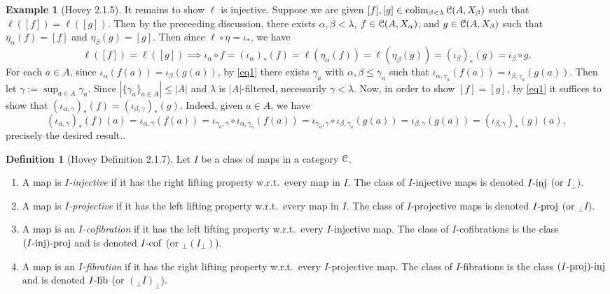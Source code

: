 \documentclass{amsart}
\theoremstyle{plain}
\theoremstyle{definition}
\newtheorem{definition}[theorem]{Definition}
\newtheorem{example}[theorem]{Example}
\newcommand{\0}{\mathbf{0}}
\newcommand{\cC}{\mathcal C}
\renewcommand{\(}{\left(}
\renewcommand{\)}{\right)}
\def\scr{\EuScript}
\def\cC{\scr{C}}
\newcommand{\inj}{\text-\mathrm{inj}}
\newcommand{\proj}{\text-\mathrm{proj}}
\newcommand{\fib}{\text-\mathrm{fib}}
\newcommand{\cof}{\text-\mathrm{cof}}
\DeclareMathOperator*{\colim}{colim}
\begin{document}
\begin{example}[Hovey 2.1.5]
  It remains to show $\ell$ is injective. Suppose we are given $[f],[g]\in\colim_{\beta<\lambda}\cC(A,X_\beta)$ such that $\ell([f])=\ell([g])$. Then by the preceeding discussion, there exists $\alpha,\beta<\lambda$, $f\in\cC(A,X_\alpha)$, and $g\in\cC(A,X_\beta)$ such that $\eta_\alpha(f)=[f]$ and $\eta_\beta(g)=[g]$. 
  Then since $\ell\circ\eta=\iota_*$, we have
  \[\ell([f])=\ell([g])\implies\iota_\alpha\circ f= (\iota_\alpha)_*(f)=\ell(\eta_\alpha(f))=\ell(\eta_\beta(g))=(\iota_\beta)_*(g)=\iota_\beta\circ g.\]
  For each $a\in A$, since $\iota_\alpha(f(a))=\iota_\beta(g(a))$, by \autoref{eq1} there exists $\gamma_a$ with $\alpha,\beta\leq\gamma_a$ such that $\iota_{\alpha,\gamma_a}(f(a))=\iota_{\beta,\gamma_a}(g(a))$. Then let $\gamma:=\sup_{a\in A}\gamma_a$. Since $|\{\gamma_a\}_{a\in A}|\leq|A|$ and $\lambda$ is $|A|$-filtered, necessarily $\gamma<\lambda$. Now, in order to show $[f]=[g]$, by \autoref{eq1} it suffices to show that $(\iota_{\alpha,\gamma})_*(f)=(\iota_{\beta,\gamma})_*(g)$. Indeed, given $a\in A$, we have
  \[(\iota_{\alpha,\gamma})_*(f)(a)=\iota_{\alpha,\gamma}(f(a))=\iota_{\gamma_a,\gamma}\circ\iota_{\alpha,\gamma_a}(f(a))=\iota_{\gamma_a,\gamma}\circ\iota_{\beta,\gamma_a}(g(a))=\iota_{\beta,\gamma}(g(a))=(\iota_{\beta,\gamma})_*(g)(a),\]
  precisely the desired result..
\end{example}

\begin{definition}[Hovey Definition 2.1.7]
  Let $I$ be a class of maps in a category $\cC$.\begin{enumerate}
    \item A map is \textit{$I$-injective} if it has the right lifting property w.r.t.\ every map in $I$. The class of $I$-injective maps is denoted $I\inj$ (or $I_\perp$).
    \item A map is \textit{$I$-projective} if it has the left lifting property w.r.t.\ every map in $I$. The class of $I$-projective maps is denoted $I\proj$ (or $_\perp I$).
    \item A map is an \textit{$I$-cofibration} if it has the left lifting property w.r.t.\ every $I$-injective map. The class of $I$-cofibrations is the class $(I\inj)\proj$ and is denoted $I\cof$ (or $_\perp(I_\perp)$).
    \item A map is an \textit{$I$-fibration} if it has the right lifting property w.r.t.\ every $I$-projective map. The class of $I$-fibrations is the class $(I\proj)\inj$ and is denoted $I\fib$ (or $(_\perp I)_\perp$).
  \end{enumerate}
\end{definition}
\end{document}
